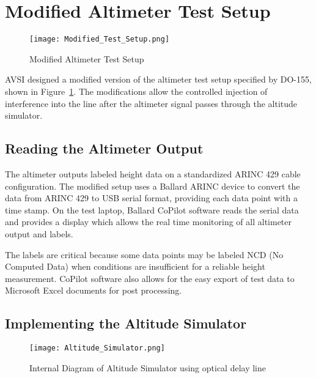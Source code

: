 \section{Modified Altimeter Test Setup} \label{sec:Modified}
\begin{figure}[ht]
\centering
\texttt{[image: Modified\_Test\_Setup.png]}
\caption{Modified Altimeter Test Setup}

\label{fig:Modified}

\end{figure}
AVSI designed a modified version of the altimeter test setup specified by DO-155, shown in Figure~\ref{fig:Modified}. The modifications allow the controlled injection of interference into the line after the altimeter signal passes  through the altitude simulator. 


\subsection{Reading the Altimeter Output}\label{sub:reading_out}
The altimeter outputs labeled height data on a standardized ARINC 429 cable configuration. The modified setup uses a Ballard ARINC device to convert the data from ARINC 429 to USB serial format, providing each data point with a time stamp. On the test laptop, Ballard CoPilot software reads the serial data and provides a display which allows the real time monitoring of all altimeter output and labels. 

The labels are critical because some data points may be labeled NCD (No Computed Data) when conditions are insufficient for a reliable height measurement. CoPilot software also allows for the easy export of test data to Microsoft Excel documents for post processing. 
\subsection{Implementing the Altitude Simulator}\label{sub:Implementing}

\begin{figure}[ht]
\centering
\texttt{[image: Altitude\_Simulator.png]}
\caption{Internal Diagram of Altitude Simulator using optical delay line}

\label{fig:Altitude_Simulator}

\end{figure}

